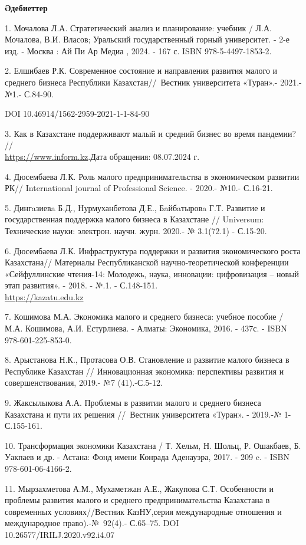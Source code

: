 \begin{center}
{\bfseries Әдебиеттер}
\end{center}

\begin{references}
1. Мочалова Л.А. Стратегический анализ и планирование: учебник / Л.А.
Мочалова, В.И. Власов; Уральский государственный горный университет. -
2-е изд. - Москва : Ай Пи Ар Медиа , 2024. - 167 с. ISBN
978-5-4497-1853-2.

2. Елшибаев Р.К. Современное состояние и направления развития малого и
среднего бизнеса Республики Казахстан//~Вестник университета «Туран».-
2021.-№1.- С.84-90.~

DOI 10.46914/1562-2959-2021-1-1-84-90

3. Как в Казахстане поддерживают малый и средний бизнес во время
пандемии?
//\\\href{https://www.inform.kz/ru/kak-v-kazahstane-podderzhivayut-malyy-i-sredniy-biznes-vo-vremya-pandemii\_a3694302}{https://www.inform.kz}.Дата
обращения: 08.07.2024 г.

4. Дюсембаева Л.К. Роль малого предпринимательства в экономическом
развитии РК// International journal of Professional Science. - 2020.-
№10.- С.16-21.

5. Дингaзиевa Б.Д., Нурмуханбетова Д.Е., Бaйбaтыровa Г.Т. Развитие и
государственная поддержка малого бизнеса в Казахстане // Universum:
Технические науки: электрон. научн. журн. 2020.- № 3.1(72.1) - С.15-20.

6. Дюсембаева Л.К. Инфраструктура поддержки и развития экономического
роста Казахстана// Материалы Республиканской научно-теоретической
конференции «Сейфуллинские чтения-14: Молодежь, наука, инновации:
цифровизация -- новый этап развития». - 2018. - №.1. - С.148-151.
\\\href{https://kazatu.edu.kz/assets/i/science/sf14\_mat\_104.pdf}{https://kazatu.edu.kz}

7. Кошимова М.А. Экономика малого и среднего бизнеса: учебное пособие /
М.А. Кошимова, А.И. Естурлиева. - Алматы: Экономика, 2016. - 437с. -
ISBN 978-601-225-853-0.

8. Арыстанова Н.К., Протасова О.В. Становление и развитие малого бизнеса
в Республике Казахстан // Инновационная экономика: перспективы развития
и совершенствования, 2019.- №7 (41).-С.5-12.

9. Жаксылыкова А.А. Проблемы в развитии малого и среднего бизнеса
Казахстана и пути их решения //~Вестник университета «Туран». - 2019.-№
1-С.155-161.

10. Трансформация экономики Казахстана / Т. Хельм, Н. Шольц, Р.
Ошакбаев, Б. Уакпаев и др. - Астана: Фонд имени Конрада Аденауэра, 2017.
- 209 c. - ISBN 978-601-06-4166-2.

11. Мырзахметова А.М., Мухаметжан А.Е., Жакупова С.Т. Особенности и
проблемы развития малого и среднего предпринимательства Казахстана в
современных условиях//Вестник КазНУ,серия международные отношения и
международное право).-№~92(4).- С.65--75. DOI\\
10.26577/IRILJ.2020.v92.i4.07
\end{references}

